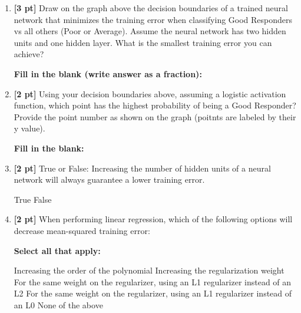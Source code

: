 \documentclass[12pt,addpoints,answers]{exam}
\begin{document}
\begin{enumerate}        
    \item {\textbf{[3 pt]}} Draw on the graph above the decision boundaries of a trained neural network that minimizes the training error when classifying Good Responders vs all others (Poor or Average). Assume the neural network has two hidden units and one hidden layer. What is the smallest training error you can achieve?
    
        \textbf{Fill in the blank (write answer as a fraction):}
    
    \begin{tcolorbox}[fit,height=1cm, width=4cm, blank, borderline={1pt}{-2pt},nobeforeafter]
    \end{tcolorbox}
    
    
    \item {\textbf{[2 pt]}} Using your decision boundaries above, assuming a logistic activation function, which point has the highest probability of being a Good Responder? Provide the point number as shown on the graph (poitnts are labeled by their y value).
    
            \textbf{Fill in the blank:}
    
    \begin{tcolorbox}[fit,height=1cm, width=4cm, blank, borderline={1pt}{-2pt},nobeforeafter]
    \end{tcolorbox}
    
    
    \item {\textbf{[2 pt]}} True or False: Increasing the number of hidden units of a neural network will always guarantee a lower training error. 
    
        \begin{checkboxes}
        \choice True
        \choice False
        \end{checkboxes}
    
    
    \item {\textbf{[2 pt]}} When performing linear regression, which of the following options will decrease mean-squared training error:
    
    \textbf{Select all that apply:}
    {\checkboxchar{$\Box$} \checkedchar{$\blacksquare$}
        \begin{checkboxes}
        \choice Increasing the order of the polynomial
        \choice Increasing the regularization weight
        \choice For the same weight on the regularizer, using an L1 regularizer instead of an L2
        \choice For the same weight on the regularizer, using an L1 regularizer instead of an L0
        \choice None of the above
        \end{checkboxes}
    }



\end{enumerate}
\end{document}
